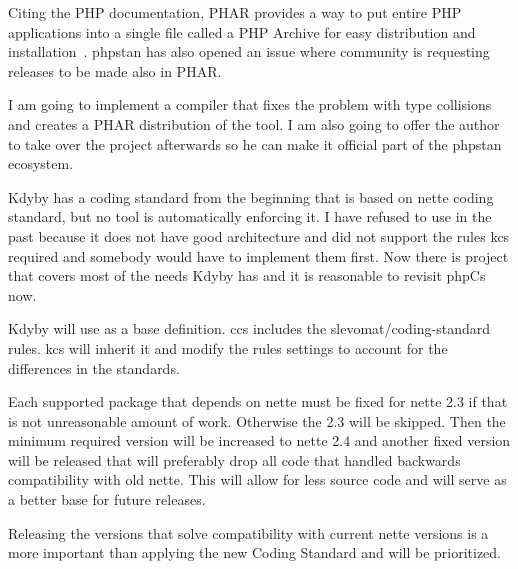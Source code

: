 Citing the PHP documentation, PHAR provides a way to put entire PHP applications into a single file called a PHP Archive for easy distribution and installation~\cite{php:phar}. \gls{phpstan} has also opened an issue  where community is requesting releases to be made also in PHAR.

I am going to implement a compiler that fixes the problem with type collisions and creates a PHAR distribution of the tool. I am also going to offer the author to take over the project afterwards so he can make it official part of the \gls{phpstan} ecosystem.


Kdyby has a coding standard from the beginning that is based on \gls{nette} coding standard, but no tool is automatically enforcing it. I have refused to use  in the past because it does not have good architecture and did not support the rules \acrlong{kcs} required and somebody would have to implement them first. Now there is  project that covers most of the needs Kdyby has and it is reasonable to revisit \gls{phpCs} now.

Kdyby will use  as a base definition. \acrlong{ccs} includes the slevomat/coding-standard rules. \acrlong{kcs} will inherit it and modify the rules settings to account for the differences in the standards.


Each supported package that depends on \gls{nette} must be fixed for \gls{nette} 2.3 if that is not unreasonable amount of work. Otherwise the 2.3 will be skipped. Then the minimum required version will be increased to \gls{nette} 2.4 and another fixed version will be released that will preferably drop all code that handled backwards compatibility with old \gls{nette}. This will allow for less source code and will serve as a better base for future releases.

Releasing the versions that solve compatibility with current \gls{nette} versions is a more important than applying the new Coding Standard and will be prioritized.


